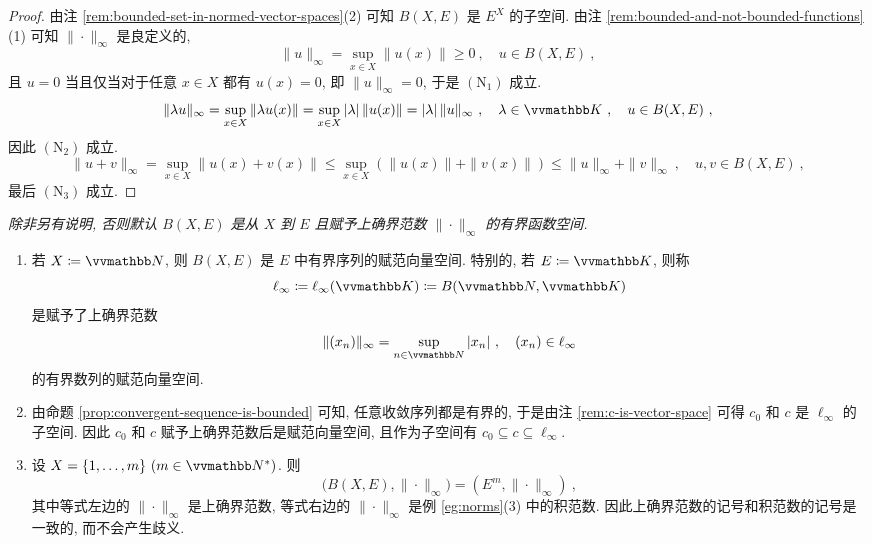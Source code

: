 \begin{proof}
    由注 \ref{rem:bounded-set-in-normed-vector-spaces}(2) 可知 \(B(X, E)\) 是 \(E^X\) 的子空间. 由注 \ref{rem:bounded-and-not-bounded-functions}(1) 可知 \(\|\!\cdot\!\|_\infty\) 是良定义的,
    \[
        \|u\|_\infty = \sup_{x \in X} \|u(x)\| \geq 0\ ,\quad u \in B(X, E)\ ,
    \]
    且 \(u = 0\) 当且仅当对于任意 \(x \in X\) 都有 \(u(x) = 0\), 即 \(\|u\|_\infty = 0\), 于是 \hyperref[ax:norm]{\((\mathrm N_1)\)} 成立.
    \[
        \|\lambda u\|_\infty = \sup_{x \in X} \|\lambda u(x)\| = \sup_{x \in X} |\lambda|\, \|u(x)\| = |\lambda|\, \|u\|_\infty\ ,\quad \lambda \in \K\ ,\quad u \in B(X, E)\ ,
    \]
    因此 \hyperref[ax:norm]{\((\mathrm N_2)\)} 成立.
    \[
        \|u + v\|_\infty = \sup_{x \in X} \|u(x) + v(x)\| \leq \sup_{x \in X} (\|u(x)\| + \|v(x)\|) \leq \|u\|_\infty + \|v\|_\infty\ ,\quad u, v \in B(X, E)\ ,
    \]
    最后 \hyperref[ax:norm]{\((\mathrm N_3)\)} 成立.
\end{proof}

\begin{center}
    \textsl{除非另有说明, 否则默认 \(B(X, E)\) 是从 \(X\) 到 \(E\) 且赋予上确界范数 \(\|\!\cdot\!\|_\infty\) 的有界函数空间.}
\end{center}

\begin{remark}
    \begin{enumerate}
        \item 若 \(X \coloneqq \N\), 则 \(B(X, E)\) 是 \(E\) 中有界序列的赋范向量空间. 特别的, 若 \(E \coloneqq \K\), 则称
        \[
            \ell_\infty \coloneqq \ell_\infty(\K) \coloneqq B(\N, \K)
        \]
        是赋予了上确界范数
        \[
            \|(x_n)\|_\infty = \sup_{n \in \N} |x_n|\ ,\quad (x_n) \in \ell_\infty
        \]
        的有界数列的赋范向量空间.
        \item 由命题 \ref{prop:convergent-sequence-is-bounded} 可知, 任意收敛序列都是有界的, 于是由注 \ref{rem:c-is-vector-space} 可得 \(c_0\) 和 \(c\) 是 \(\ell_\infty\) 的子空间. 因此 \(c_0\) 和 \(c\) 赋予上确界范数后是赋范向量空间, 且作为子空间有 \(c_0 \subseteq c \subseteq \ell_\infty\).
        \item 设 \(X = \{1, \ldots, m\}\ (m \in \N^\ast)\). 则
        \[
            \bigl(B(X, E), \|\!\cdot\!\|_\infty\bigr) = (E^m, \|\!\cdot\!\|_\infty)\ ,
        \]
        其中等式左边的 \(\|\!\cdot\!\|_\infty\) 是上确界范数, 等式右边的 \(\|\!\cdot\!\|_\infty\) 是例 \ref{eg:norms}(3) 中的积范数. 因此上确界范数的记号和积范数的记号是一致的, 而不会产生歧义.
    \end{enumerate}
\end{remark}

